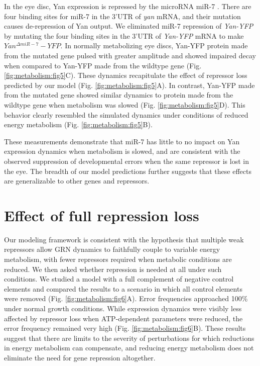 In the eye disc, Yan expression is repressed by the microRNA miR-7 \cite{Li2005}. There are four binding sites for miR-7 in the 3'UTR of \textit{yan} mRNA, and their mutation causes de-repression of Yan output. We eliminated miR-7 repression of \textit{Yan-YFP} by mutating the four binding sites in the 3'UTR of \textit{Yan-YFP} mRNA to make $Yan^{\Delta miR-7}-YFP$. In normally metabolizing eye discs, Yan-YFP protein made from the mutated gene pulsed with greater amplitude and showed impaired decay when compared to Yan-YFP made from the wildtype gene (Fig. \ref{fig:metabolism:fig5}C). These dynamics recapitulate the effect of repressor loss predicted by our model (Fig. \ref{fig:metabolism:fig5}A). In contrast, Yan-YFP made from the mutated gene showed similar dynamics to protein made from the wildtype gene when metabolism was slowed (Fig. \ref{fig:metabolism:fig5}D). This behavior clearly resembled the simulated dynamics under conditions of reduced energy metabolism (Fig. \ref{fig:metabolism:fig5}B).

These measurements demonstrate that miR-7 has little to no impact on Yan expression dynamics when metabolism is slowed, and are consistent with the observed suppression of developmental errors when the same repressor is lost in the eye. The breadth of our model predictions further suggests that these effects are generalizable to other genes and repressors.

\section{Effect of full repression loss}

Our modeling framework is consistent with the hypothesis that multiple weak repressors allow GRN dynamics to faithfully couple to variable energy metabolism, with fewer repressors required when metabolic conditions are reduced. We then asked whether repression is needed at all under such conditions. We studied a model with a full complement of negative control elements and compared the results to a scenario in which all control elements were removed (Fig. \ref{fig:metabolism:fig6}A). Error frequencies approached 100\% under normal growth conditions. While expression dynamics were visibly less affected by repressor loss when ATP-dependent parameters were reduced, the error frequency remained very high (Fig. \ref{fig:metabolism:fig6}B). These results suggest that there are limits to the severity of perturbations for which reductions in energy metabolism can compensate, and reducing energy metabolism does not eliminate the need for gene repression altogether.

